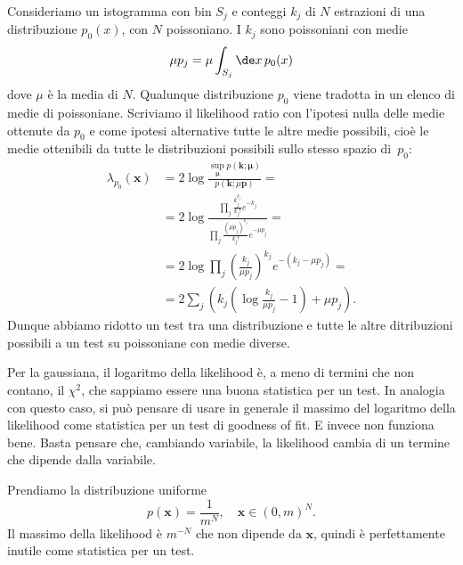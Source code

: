 

Consideriamo un istogramma con bin $S_j$ e conteggi $k_j$
di $N$ estrazioni di una distribuzione $p_0(x)$,
con $N$ poissoniano.
I $k_j$ sono poissoniani con medie
\begin{equation*}
	\mu p_j = \mu \int_{S_j} \de x\, p_0(x)
\end{equation*}
dove $\mu$ è la media di $N$.
Qualunque distribuzione $p_0$ viene tradotta in un elenco di medie di poissoniane.
Scriviamo il likelihood ratio con l'ipotesi nulla delle medie ottenute da $p_0$
e come ipotesi alternative tutte le altre medie possibili,
cioè le medie ottenibili da tutte le distribuzioni possibili sullo stesso spazio di~$p_0$:
\begin{align*}
	\lambda_{p_0}(\mathbf x)
	&= 2\log \frac
	{\sup\limits_{\boldsymbol\mu} p(\mathbf k;\boldsymbol\mu)}
	{p(\mathbf k;\mu \mathbf p)} = \\
	&= 2\log \frac
	{\prod_j \frac {k_j^{k_j}} {k_j!} e^{-k_j}}
	{\prod_j \frac {(\mu p_j)^{k_j}} {k_j!} e^{-\mu p_j}} = \\
	&= 2\log \prod_j \left(\frac{k_j}{\mu p_j}\right)^{k_j} e^{-(k_j-\mu p_j)} = \\
	&= 2\sum_j \left( k_j\left(\log\frac{k_j}{\mu p_j}-1\right) + \mu p_j \right).
\end{align*}
Dunque abbiamo ridotto un test tra una distribuzione e tutte le altre ditribuzioni possibili
a un test su poissoniane con medie diverse.


Per la gaussiana,
il logaritmo della likelihood è, a meno di termini che non contano, il $\chi^2$,
che sappiamo essere una buona statistica per un test.
In analogia con questo caso,
si può pensare di usare in generale il massimo del logaritmo della likelihood
come statistica per un test di goodness of fit.
E invece non funziona bene.
Basta pensare che, cambiando variabile,
la likelihood cambia di un termine che dipende dalla variabile.

\begin{example}
	Prendiamo la distribuzione uniforme
	\begin{equation*}
		p(\mathbf x) = \frac1{m^N},
		\quad \mathbf x \in (0,m)^N.
	\end{equation*}
	Il massimo della likelihood è $m^{-N}$ che non dipende da $\mathbf x$,
	quindi è perfettamente inutile come statistica per un test.
\end{example}

